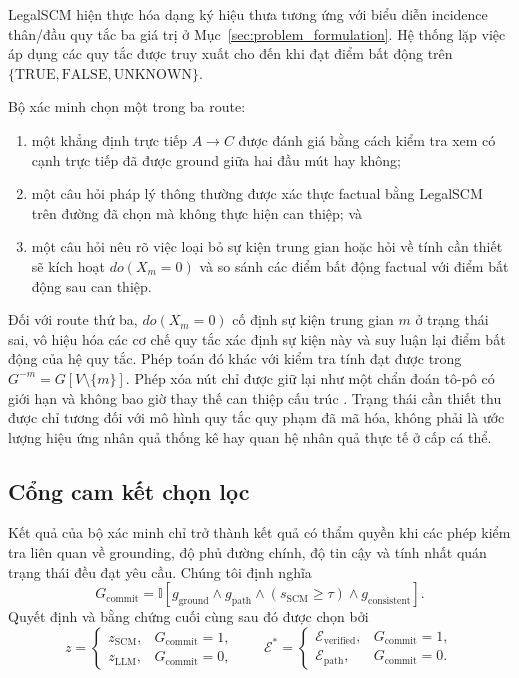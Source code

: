 LegalSCM hiện thực hóa dạng ký hiệu thưa tương ứng với biểu diễn incidence
thân/đầu quy tắc ba giá trị ở Mục~\ref{sec:problem_formulation}. Hệ thống lặp
việc áp dụng các quy tắc được truy xuất cho đến khi đạt điểm bất động trên
$\{\mathrm{TRUE},\mathrm{FALSE},\mathrm{UNKNOWN}\}$.

Bộ xác minh chọn một trong ba route:

\begin{enumerate}
    \item một khẳng định trực tiếp $A\rightarrow C$ được đánh giá bằng cách
    kiểm tra xem có cạnh trực tiếp đã được ground giữa hai đầu mút hay không;
    \item một câu hỏi pháp lý thông thường được xác thực factual bằng LegalSCM
    trên đường đã chọn mà không thực hiện can thiệp; và
    \item một câu hỏi nêu rõ việc loại bỏ sự kiện trung gian hoặc hỏi về tính
    cần thiết sẽ kích hoạt $do(X_m=0)$ và so sánh các điểm bất động factual với
    điểm bất động sau can thiệp.
\end{enumerate}

Đối với route thứ ba, $do(X_m=0)$ cố định sự kiện trung gian $m$ ở trạng thái
sai, vô hiệu hóa các cơ chế quy tắc xác định sự kiện này và suy luận lại điểm
bất động của hệ quy tắc. Phép toán đó khác với kiểm tra tính đạt được trong
$G^{-m}=G[V\setminus\{m\}]$. Phép xóa nút chỉ được giữ lại như một chẩn đoán
tô-pô có giới hạn và không bao giờ thay thế can thiệp cấu trúc
\cite{pearl2009causality}. Trạng thái cần thiết thu được chỉ tương đối với mô
hình quy tắc quy phạm đã mã hóa, không phải là ước lượng hiệu ứng nhân quả thống
kê hay quan hệ nhân quả thực tế ở cấp cá thể.

\subsection{Cổng cam kết chọn lọc}

Kết quả của bộ xác minh chỉ trở thành kết quả có thẩm quyền khi các phép kiểm
tra liên quan về grounding, độ phủ đường chính, độ tin cậy và tính nhất quán
trạng thái đều đạt yêu cầu. Chúng tôi định nghĩa
\begin{equation}
G_{\mathrm{commit}}
=
\mathbb{I}
[
g_{\mathrm{ground}}
\land g_{\mathrm{path}}
\land (s_{\mathrm{SCM}}\geq\tau)
\land g_{\mathrm{consistent}}
].
\end{equation}
Quyết định và bằng chứng cuối cùng sau đó được chọn bởi
\begin{equation}
z=
\begin{cases}
z_{\mathrm{SCM}}, & G_{\mathrm{commit}}=1,\\
z_{\mathrm{LLM}}, & G_{\mathrm{commit}}=0,
\end{cases}
\qquad
\mathcal{E}^*=
\begin{cases}
\mathcal{E}_{\mathrm{verified}}, & G_{\mathrm{commit}}=1,\\
\mathcal{E}_{\mathrm{path}}, & G_{\mathrm{commit}}=0.
\end{cases}
\label{eq:selective_commit}
\end{equation}

